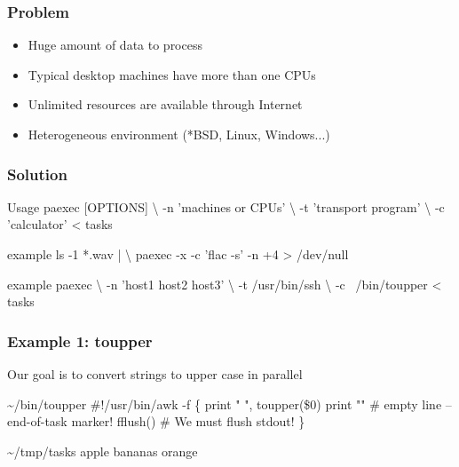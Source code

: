 \documentclass[hyperref={colorlinks=true}]{beamer}
\begin{document}

\begin{frame}
  \titlepage
\end{frame}

\begin{frame}{}
  \frametitle{Problem}
  \begin{block}{}
    \begin{itemize}
    \item Huge amount of data to process
    \item Typical desktop machines have more than one CPUs
    \item Unlimited resources are available through Internet
    \item Heterogeneous environment (*BSD, Linux, Windows...)
    \end{itemize}
  \end{block}
\end{frame}

\begin{frame}[fragile]
  \frametitle{Solution}

  \begin{block}{}
      \begin{CodeLarge}{Usage}
paexec [OPTIONS] \textbackslash
  -n 'machines or CPUs' \textbackslash
  -t 'transport program' \textbackslash
  -c 'calculator' < tasks
      \end{CodeLarge}
      \begin{CodeLarge}{example}
ls -1 *.wav | \textbackslash
paexec -x -c 'flac -s' -n +4 > /dev/null
      \end{CodeLarge}
      \begin{CodeLarge}{example}
paexec \textbackslash
  -n 'host1 host2 host3' \textbackslash
  -t /usr/bin/ssh \textbackslash
  -c ~/bin/toupper < tasks
      \end{CodeLarge}
  \end{block}
\end{frame}

\begin{frame}[fragile]
  \frametitle{Example 1: toupper}
  Our goal is to convert strings to upper case in parallel
  \begin{block}{}
      \begin{Code}{\~{}/bin/toupper}
#!/usr/bin/awk -f
\{
   print " ", toupper(\$0)
   print ""  # empty line -- end-of-task marker!
   fflush()  # We must flush stdout!
\}
      \end{Code}
  \end{block}
  \begin{block}{}
      \begin{Code}{\~{}/tmp/tasks}
apple
bananas
orange
      \end{Code}
  \end{block}
\end{frame}
\end{document}
